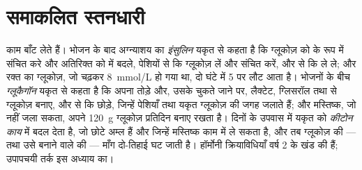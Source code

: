 \section{समाकलित स्तनधारी}

\begin{proposition}[भरा हुआ और उपवास में]\label{prop:b1:biosyntheses-integration:fedfasting}
 काम बाँट लेते हैं। भोजन के बाद अग्न्याशय का \emph{इंसुलिन}
यकृत से कहता है कि ग्लूकोज़ को  के रूप में संचित करे और
अतिरिक्त को  में बदले, पेशियों से कि ग्लूकोज़ लें और  संचित
करें, और   से कि  ले ले; और रक्त का ग्लूकोज़, जो चढ़कर
\qty{8}{mmol/L} हो गया था, दो घंटे में \qty{5}{} पर लौट आता है। भोजनों के
बीच \emph{ग्लूकैगॉन} यकृत से कहता है कि अपना  तोड़े और, उसके
चुकते जाने पर, लैक्टेट, ग्लिसरॉल तथा  से ग्लूकोज़ बनाए, और
  से कि  छोड़े, जिन्हें पेशियाँ तथा यकृत ग्लूकोज़ की जगह
जलाते हैं; और मस्तिष्क, जो  नहीं जला सकता, अपने \qty{120}{g} ग्लूकोज़
प्रतिदिन बनाए रखता है। दिनों के उपवास में यकृत  को
\emph{कीटोन काय} में बदल देता है, जो छोटे अम्ल हैं और जिन्हें मस्तिष्क
काम में ले सकता है, और तब ग्लूकोज़ की --- तथा उसे बनाने वाले  की
--- माँग दो-तिहाई घट जाती है। हॉर्मोनी क्रियाविधियाँ वर्ष 2 के खंड की
हैं; उपापचयी तर्क इस अध्याय का।
\end{proposition}

